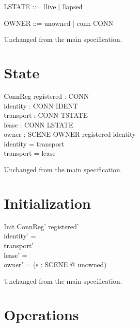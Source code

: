 \documentclass[a4paper,10pt,fleqn]{article}
\begin{document}
\begin{zed}
  LSTATE ::= llive | llapsed
\end{zed}

\begin{zed}
  OWNER ::= unowned | conn \ldata CONN \rdata
\end{zed}

Unchanged from the main specification.

\section{State}

\begin{schema}{ConnReg}
  registered : \power CONN \\
  identity : CONN \pfun IDENT \\
  transport : CONN \pfun TSTATE \\
  lease : CONN \pfun LSTATE \\
  owner : SCENE \fun OWNER
\where
  registered \subseteq \dom identity \\
  \dom identity = \dom transport \\
  \dom transport = \dom lease
\end{schema}

Unchanged from the main specification.

\section{Initialization}

\begin{schema}{Init}
  ConnReg'
\where
  registered' = \emptyset \\
  identity' = \emptyset \\
  transport' = \emptyset \\
  lease' = \emptyset \\
  owner' = (\lambda s : SCENE @ unowned)
\end{schema}

Unchanged from the main specification.

\section{Operations}
\end{document}
